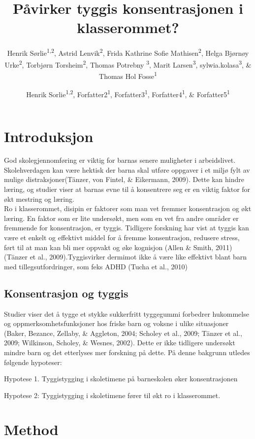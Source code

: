 \documentclass[
  english,
  man]{apa6}
\title{Påvirker tyggis konsentrasjonen i klasserommet?}
\author{Henrik Sørlie\textsuperscript{1,2}, Astrid Lenvik\textsuperscript{2}, Frida Kathrine Sofie Mathisen\textsuperscript{2}, Helga Bjørnøy Urke\textsuperscript{2}, Torbjørn Torsheim\textsuperscript{2}, Thomas Potrebny \textsuperscript{3}, Marit Larsen\textsuperscript{3}, sylwia.kolasa\textsuperscript{3}, \& Thomas Hol Fosse\textsuperscript{1}}
\date{}
\affiliation{
\vspace{0.5cm}
\textsuperscript{1} Forsvarets høgskole\\\textsuperscript{2} Universitetet i Bergen\\\textsuperscript{3} Hoegskulen på Vestlandet\\\textsuperscript{4} Norce}
\author{Henrik Sorlie\textsuperscript{1,2}, Forfatter2\textsuperscript{1}, Forfatter3\textsuperscript{1}, Forfatter4\textsuperscript{1}, \& Forfatter5\textsuperscript{1}}
\affiliation{
\vspace{0.5cm}
\textsuperscript{1} Forsvarets hogskole\\\textsuperscript{2} Universitetet i Bergen}
\begin{document}
\maketitle

\hypertarget{introduksjon}{%
\section{Introduksjon}\label{introduksjon}}

God skolegjennomføring er viktig for barnas senere muligheter i arbeidslivet.
Skolehverdagen kan være hektisk der barna skal utføre oppgaver i et miljø fylt av mulige distraksjoner(Tänzer, von Fintel, \& Eikermann, 2009).
Dette kan hindre læring, og studier viser at barnas evne til å konsentrere seg er en viktig faktor for økt mestring og læring.\\
Ro i klasserommet, disipin er faktorer som man vet fremmer konsentrasjon og økt læring.
En faktor som er lite undersøkt, men som en vet fra andre områder er fremmende for konsentrasjon, er tyggis.
Tidligere forskning har vist at tyggis kan være et enkelt og effektivt middel for å fremme konsentrasjon, redusere stress, ført til at man kan bli mer oppvakt og øke kognisjon (Allen \& Smith, 2011)(Tänzer et al., 2009).Tyggisvirker dermimot ikke å være like effektivt blant barn med tillegsutfordringer, som feks ADHD (Tucha et al., 2010)

\hypertarget{konsentrasjon-og-tyggis}{%
\subsection{Konsentrasjon og tyggis}\label{konsentrasjon-og-tyggis}}

Studier viser det å tygge et stykke sukkerfritt tyggegummi forbedrer hukommelse og oppmerksomhetsfunksjoner hos friske barn og voksne i ulike situasjoner (Baker, Bezance, Zellaby, \& Aggleton, 2004; Scholey et al., 2009; Tänzer et al., 2009; Wilkinson, Scholey, \& Wesnes, 2002). Dette er ikke tidligere undersøkt mindre barn og det etterlyses mer forskning på dette.
På denne bakgrunn utledes følgende hypoteser:

Hypotese 1. Tyggistygging i skoletimene på barneskolen øker konsentrasjonen

Hypotese 2: Tyggistygging i skoletimene fører til økt ro i klasserommet.

\hypertarget{method}{%
\section{Method}\label{method}}
\end{document}
